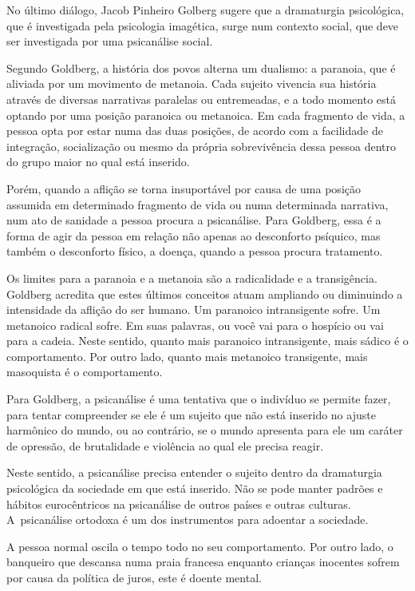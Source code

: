  

No último diálogo, Jacob Pinheiro Golberg sugere que a dramaturgia
psicológica, que é investigada pela psicologia imagética, surge num
contexto social, que deve ser investigada por uma psicanálise social.

Segundo Goldberg, a história dos povos alterna um dualismo: a paranoia,
que é aliviada por um movimento de metanoia. Cada sujeito vivencia sua
história através de diversas narrativas paralelas ou entremeadas, e a
todo momento está optando por uma posição paranoica ou metanoica. Em
cada fragmento de vida, a pessoa opta por estar numa das duas posições,
de acordo com a facilidade de integração, socialização ou mesmo da
própria sobrevivência dessa pessoa dentro do grupo maior no qual está
inserido.

Porém, quando a aflição se torna insuportável por causa de uma posição
assumida em determinado fragmento de vida ou numa determinada narrativa,
num ato de sanidade a pessoa procura a psicanálise. Para Goldberg, essa
é a forma de agir da pessoa em relação não apenas ao desconforto
psíquico, mas também o desconforto físico, a doença, quando a pessoa
procura tratamento.

Os limites para a paranoia e a metanoia são a radicalidade e a
transigência. Goldberg acredita que estes últimos conceitos atuam
ampliando ou diminuindo a intensidade da aflição do ser humano. Um
paranoico intransigente sofre. Um metanoico radical sofre. Em suas
palavras, ou você vai para o hospício ou vai para a cadeia. Neste
sentido, quanto mais paranoico intransigente, mais sádico é o
comportamento. Por outro lado, quanto mais metanoico transigente, mais
masoquista é o comportamento.

Para Goldberg, a psicanálise é uma tentativa que o indivíduo se permite
fazer, para tentar compreender se ele é um sujeito que não está
inserido no ajuste harmônico do mundo, ou ao contrário, se o mundo
apresenta para ele um caráter de opressão, de brutalidade e violência ao
qual ele precisa reagir.

Neste sentido, a psicanálise precisa entender o sujeito dentro da
dramaturgia psicológica da sociedade em que está inserido. Não se pode
manter padrões e hábitos eurocêntricos na psicanálise de outros países e
outras culturas. A~psicanálise ortodoxa é um dos instrumentos para
adoentar a sociedade.

A pessoa normal oscila o tempo todo no seu comportamento. Por outro
lado, o banqueiro que descansa numa praia francesa enquanto crianças
inocentes sofrem por causa da política de juros, este é doente mental.

